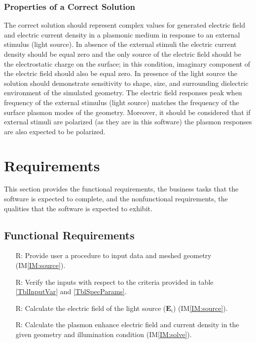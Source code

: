 \documentclass[12pt]{article}
\newcounter{reqnum} %
\begin{document}
	\subsubsection{Properties of a Correct Solution} \label{sec_CorrectSolution}
	
	The correct solution should represent complex values for generated electric
	field and electric current density in a plasmonic medium in response to an
	external stimulus (light source). In absence of the external stimuli the
	electric current density should be equal zero and the only source of the
	electric field should be the electrostatic charge on the surface; in this
	condition, imaginary component of the electric field should also be equal zero.
	In presence of the light source the solution should demonstrate sensitivity to
	shape, size, and surrounding dielectric environment of the simulated geometry.
	The electric field responses peak when frequency of the external stimulus
	(light source) matches the frequency of the surface plasmon modes of the
	geometry. Moreover, it should be considered that if external stimuli are
	polarized (as they are in this software) the plasmon responses are also
	expected to be polarized.
	
	
	
	
	\section{Requirements} \label{req}
	
	This section provides the functional requirements, the business tasks that the
	software is expected to complete, and the nonfunctional requirements, the
	qualities that the software is expected to exhibit.
	
	\subsection{Functional Requirements}
	
	\noindent \begin{itemize}
		
		\item[R\refstepcounter{reqnum}\thereqnum \label{R_1}:] Provide user a
		procedure to input data and meshed geometry (IM\ref{IM:source}).
		
		\item[R\refstepcounter{reqnum}\thereqnum \label{R_2}:] Verify the inputs with
		respect to the criteria provided in table \ref{TblInputVar} and
		\ref{TblSpecParams}.
		
		\item[R\refstepcounter{reqnum}\thereqnum \label{R_3}:] Calculate the electric
		field of the light source ($\textbf{E}_i$) (IM\ref{IM:source}).
		
		\item[R\refstepcounter{reqnum}\thereqnum \label{R_4}:] Calculate the plasmon
		enhance electric field and current density in the given geometry and
		illumination condition (IM\ref{IM:solve}).
		
		
		
	\end{itemize}
	
\end{document}
